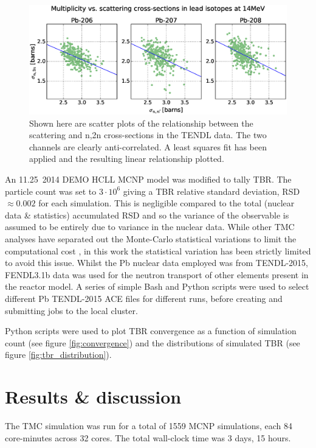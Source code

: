 \begin{figure}[ht]
	\includegraphics[width=\textwidth]{pb_el_n2n_corr}
  \caption{Shown here are scatter plots of the relationship between the scattering and n,2n cross-sections in the TENDL data. The two channels are clearly anti-correlated. A least squares fit has been applied and the resulting linear relationship plotted.}
	\label{fig:pb_el_n2n_corr}
\end{figure}

An 11.25\degree \ 2014 DEMO HCLL MCNP model was modified to tally TBR. The particle count was set to $3\cdot10^{6}$ giving a TBR relative standard deviation, RSD $\approx 0.002$ for each simulation. This is negligible compared to the total (nuclear data \& statistics) accumulated RSD and so the variance of the observable is assumed to be entirely due to variance in the nuclear data. While other TMC analyses have separated out the Monte-Carlo statistical variations to limit the computational cost \cite{Rochman2014a}, in this work the statistical variation has been strictly limited to avoid this issue. Whilst the Pb nuclear data employed was from TENDL-2015, FENDL3.1b data was used for the neutron transport of other elements present in the reactor model. A series of simple Bash and Python scripts were used to select different Pb TENDL-2015 ACE files for different runs, before creating and submitting jobs to the local cluster.

Python scripts were used to plot TBR convergence as a function of simulation count (see figure \ref{fig:convergence}) and the distributions of simulated TBR (see figure \ref{fig:tbr_distribution}).

\section{Results \& discussion}

The TMC simulation was run for a total of 1559 MCNP simulations, each 84 core-minutes across 32 cores. The total wall-clock time was 3 days, 15 hours.

